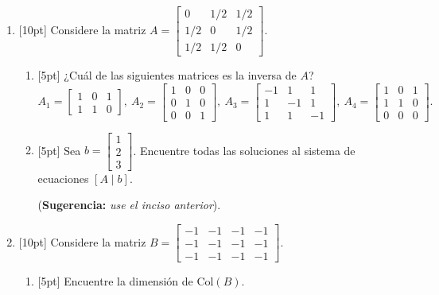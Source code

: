 \documentclass[11pt]{article}
\begin{document}
\begin{enumerate}
\item{}[10pt] Considere la matriz $A = \begin{bmatrix}0&1/2&1/2\\1/2&0&1/2\\1/2&1/2&0\end{bmatrix}$.
\begin{enumerate}
\item{}[5pt] ¿Cuál de las siguientes matrices es la inversa de $A$?
\[
A_1=\begin{bmatrix}1&0&1\\1&1&0\end{bmatrix},\ A_2=\begin{bmatrix}1&0&0\\0&1&0\\0&0&1\end{bmatrix},\ A_3=\begin{bmatrix}-1&1&1\\1&-1&1\\1&1&-1\end{bmatrix},\ A_4=\begin{bmatrix}1&0&1\\1&1&0\\0&0&0\end{bmatrix}.
\]

\vspace{4pt}

\item{}[5pt] Sea $b = \begin{bmatrix}1\\2\\3\end{bmatrix}$. Encuentre todas las soluciones al sistema de ecuaciones $[A\mid b]$.

\noindent (\textbf{Sugerencia:} \textit{use el inciso anterior}).

\vspace{4pt}
\fbox{\begin{minipage}[t][2.2cm]{\dimexpr\linewidth-2\fboxsep-2\fboxrule}
\phantom{x}
\end{minipage}}
\end{enumerate}

\item{}[10pt] Considere la matriz $B = \begin{bmatrix}-1&-1&-1&-1\\-1&-1&-1&-1\\-1&-1&-1&-1\end{bmatrix}$.
\begin{enumerate}
\item{}[5pt] Encuentre la dimensión de $\mathrm{Col}(B)$.


\end{enumerate}
\end{enumerate}
\end{document}
